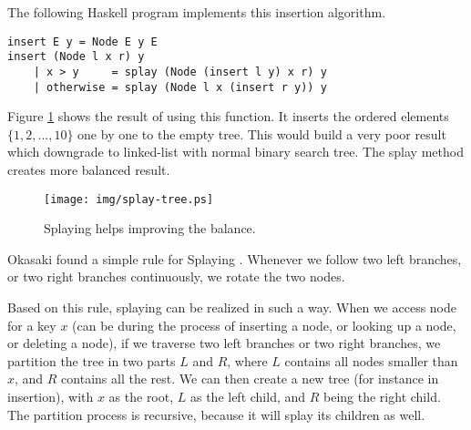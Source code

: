 \documentclass{article}
\begin{document}
The following Haskell program implements this insertion algorithm.

\lstset{language=Haskell}
\begin{lstlisting}
insert E y = Node E y E
insert (Node l x r) y
    | x > y     = splay (Node (insert l y) x r) y
    | otherwise = splay (Node l x (insert r y)) y
\end{lstlisting}

Figure \ref{fig:splay-result} shows the result of using this function.
It inserts the ordered elements $\{1, 2, ..., 10\}$
one by one to the empty tree. This would build a very poor result
which downgrade to linked-list with normal binary search tree.
The splay method creates more balanced result.

\begin{figure}[htbp]
  \centering
  \texttt{[image: img/splay-tree.ps]}
  \caption{Splaying helps improving the balance.}
  \label{fig:splay-result}
\end{figure}

Okasaki found a simple rule for Splaying \cite{okasaki-book}.
Whenever we follow
two left branches, or two right branches continuously, we rotate
the two nodes.

Based on this rule, splaying can be realized in such a way.
When we access node for a key $x$ (can be during the process of
inserting a node, or looking up a node, or deleting a node), if
we traverse two left branches or two right branches, we
partition the tree in two parts $L$ and $R$, where $L$ contains all
nodes smaller than $x$, and $R$ contains all the rest.
We can then create a new tree (for instance in insertion),
with $x$ as the root, $L$ as the left child, and $R$ being the right child.
The partition process is recursive, because it will splay
its children as well.
\end{document}

